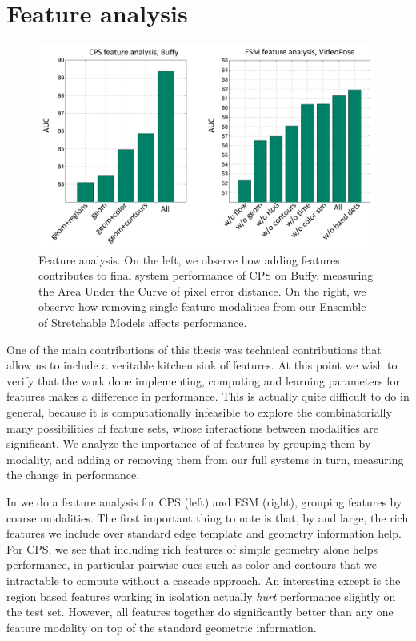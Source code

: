 \section{Feature analysis}
\begin{figure}[tb]
\begin{center}
\includegraphics[width=0.99\textwidth]{figs/ablative-bars}
\caption[Feature analysis.]{Feature analysis.  On the left, we observe how 
adding features contributes to final system performance of CPS on Buffy, 
measuring the Area Under the Curve of pixel error distance.  On the right, we 
observe how removing single feature modalities from our Ensemble of Stretchable 
Models affects performance.}
\label{fig:ablative}
\end{center}
\end{figure}

One of the main contributions of this thesis was technical contributions that 
allow us to include a veritable kitchen sink of features.  At this point we 
wish to verify that the work done implementing, computing and learning 
parameters for features makes a difference in performance.  This is actually 
quite difficult to do in general, because it is computationally infeasible to 
explore the combinatorially many possibilities of feature sets, whose 
interactions between modalities are significant.  We analyze the importance of 
of features by grouping them by modality, and adding or removing them from our 
full systems in turn, measuring the change in performance.

In  we do a feature analysis for CPS (left) and ESM (right), 
grouping features by coarse modalities.  The first important thing to note is 
that, by and large, the rich features we include over standard edge template 
and geometry information help.  For CPS, we see that including rich features of 
simple geometry alone helps performance, in particular pairwise cues such as 
color and contours that we intractable to compute without a cascade approach.  
An interesting except is the region based features working in isolation 
actually {\em hurt} performance slightly on the test set.  However, all 
features together do significantly better than any one feature modality on top 
of the standard geometric information.

